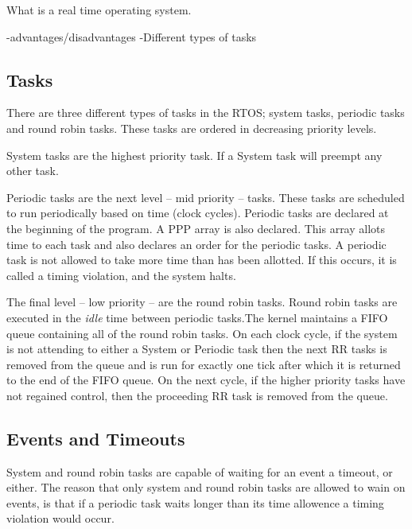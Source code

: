 What is a real time operating system.

-advantages/disadvantages
-Different types of tasks
\subsection{Tasks}

There are three different types of tasks in the RTOS; system tasks, periodic tasks and round robin tasks. These tasks are ordered in decreasing priority levels. \\


System tasks are the highest priority task. If a System task will preempt any other task.\\


Periodic tasks are the next level -- mid priority -- tasks. These tasks are scheduled to run periodically based on time (clock cycles). 
Periodic tasks are declared at the beginning of the program. A PPP array is also declared. This array allots time to each task and also declares an order for the periodic tasks. A periodic task is not allowed to take more time than has been allotted. If this occurs, it is called a timing violation, and the system halts.  \\


The final level -- low priority -- are the round robin tasks. Round robin tasks are executed in the \textit{idle} time between periodic tasks.The kernel maintains a FIFO queue containing all of the round robin tasks. On each clock cycle, if the system is not attending to either a System or Periodic task then the next RR tasks is removed from the queue and is run for exactly one tick after which it is returned to the end of the FIFO queue. On the next cycle, if the higher priority tasks have not regained control, then the proceeding RR task is removed from the queue.  



\subsection{Events and Timeouts}

System and round robin tasks are capable of waiting for an event a timeout, or
either. The reason that only system and round robin tasks are allowed to wain on events, is that if a periodic task waits longer than its time allowence a timing violation would occur. \\

